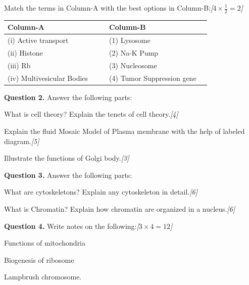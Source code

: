 \documentclass[11pt,a4paper]{article}
\newcommand{\pts}[1]{\hfill   \textit{[#1]}}
\begin{document}
\begin{parts}
  \item Match the terms in Column-A with the best options in Column-B:\pts{$4  \times \frac{1}{2} = 2$}
  
\begin{center}
    \renewcommand{\arraystretch}{1.2}
    
\begin{tabular}{llp{0.5cm}ll}
      \hline
   \textbf{Column-A} & & &   \textbf{Column-B} \\
      \hline
      (i) Active transport & & & (1) Lysosome \\
      (ii) Histone & & & (2) Na-K Pump \\
      (iii) Rb & & & (3) Nucleosome \\
      (iv) Multivesicular Bodies & & & (4) Tumor Suppression gene \\
      \hline
    \end{tabular}
  \end{center}
\end{parts}

\medskip


\noindent   \textbf{Question 2.} Answer the following parts:

\begin{parts}
  \item What is cell theory? Explain the tenets of cell theory.\pts{4}
  \item Explain the fluid Mosaic Model of Plasma membrane with the help of labeled diagram.\pts{5}
  \item Illustrate the functions of Golgi body.\pts{3}
\end{parts}

\medskip


\noindent   \textbf{Question 3.} Answer the following parts:

\begin{parts}
  \item What are cytoskeletons? Explain any cytoskeleton in detail.\pts{6}
  \item What is Chromatin? Explain how chromatin are organized in a nucleus.\pts{6}
\end{parts}

\medskip


\noindent   \textbf{Question 4.} Write notes on the following:\pts{$3  \times 4 = 12$}

\begin{parts}
  \item Functions of mitochondria
  \item Biogenesis of ribosome
  \item Lampbrush chromosome.
\end{parts}
\end{document}

